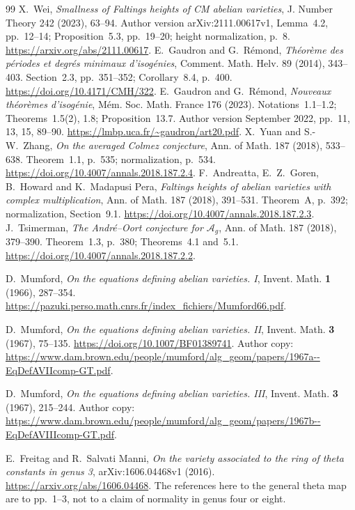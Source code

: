\documentclass[11pt]{article}
\theoremstyle{definition}
\theoremstyle{remark}
\begin{document}
\begin{thebibliography}{99}
 X.~Wei, \emph{Smallness of Faltings heights of CM
abelian varieties}, J. Number Theory 242 (2023), 63--94.
Author version arXiv:2111.00617v1, Lemma~4.2, pp.~12--14;
Proposition~5.3, pp.~19--20; height normalization, p.~8.
\url{https://arxiv.org/abs/2111.00617}.
 E.~Gaudron and G.~R\'emond,
\emph{Th\'eor\`eme des p\'eriodes et degr\'es minimaux d'isog\'enies},
Comment. Math. Helv. 89 (2014), 343--403.
Section~2.3, pp.~351--352; Corollary~8.4, p.~400.
\url{https://doi.org/10.4171/CMH/322}.
 E.~Gaudron and G.~R\'emond,
\emph{Nouveaux th\'eor\`emes d'isog\'enie},
M\'em. Soc. Math. France 176 (2023).
Notations~1.1--1.2; Theorems~1.5(2), 1.8; Proposition~13.7.
Author version September 2022, pp.~11, 13, 15, 89--90.
\url{https://lmbp.uca.fr/~gaudron/art20.pdf}.
 X.~Yuan and S.-W.~Zhang,
\emph{On the averaged Colmez conjecture},
Ann. of Math. 187 (2018), 533--638.
Theorem~1.1, p.~535; normalization, p.~534.
\url{https://doi.org/10.4007/annals.2018.187.2.4}.
 F.~Andreatta, E.~Z.~Goren, B.~Howard and
K.~Madapusi Pera, \emph{Faltings heights of abelian varieties
with complex multiplication}, Ann. of Math. 187 (2018), 391--531.
Theorem~A, p.~392; normalization, Section~9.1.
\url{https://doi.org/10.4007/annals.2018.187.2.3}.
 J.~Tsimerman, \emph{The Andr\'e--Oort conjecture
for $\mathcal A_g$}, Ann. of Math. 187 (2018), 379--390.
Theorem~1.3, p.~380; Theorems~4.1 and~5.1.
\url{https://doi.org/10.4007/annals.2018.187.2.2}.

D.~Mumford,
\emph{On the equations defining abelian varieties. I},
Invent. Math. \textbf{1} (1966), 287--354.
\url{https://pazuki.perso.math.cnrs.fr/index_fichiers/Mumford66.pdf}.

D.~Mumford,
\emph{On the equations defining abelian varieties. II},
Invent. Math. \textbf{3} (1967), 75--135.
\url{https://doi.org/10.1007/BF01389741}.
Author copy:
\url{https://www.dam.brown.edu/people/mumford/alg_geom/papers/1967a--EqDefAVIIcomp-GT.pdf}.

D.~Mumford,
\emph{On the equations defining abelian varieties. III},
Invent. Math. \textbf{3} (1967), 215--244.
Author copy:
\url{https://www.dam.brown.edu/people/mumford/alg_geom/papers/1967b--EqDefAVIIIcomp-GT.pdf}.

E.~Freitag and R.~Salvati Manni,
\emph{On the variety associated to the ring of theta constants in genus 3},
arXiv:1606.04468v1 (2016).
\url{https://arxiv.org/abs/1606.04468}.
The references here to the general theta map are to pp.~1--3,
not to a claim of normality in genus four or eight.


\end{thebibliography}
\end{document}
